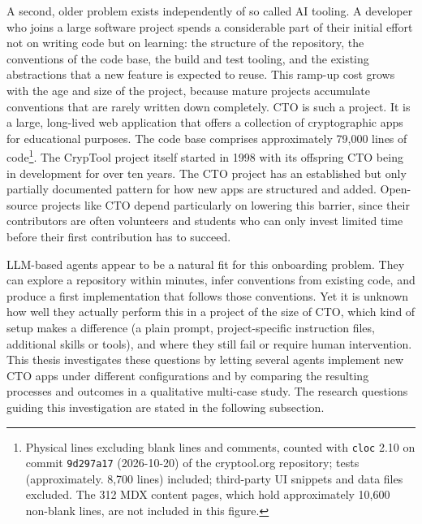 A second, older problem exists independently of so called \ac{AI} tooling.  A developer who joins a large software project spends a considerable part of their initial effort not on writing code but on learning: the structure of the repository, the conventions of the code base, the build and test tooling, and the existing abstractions that a new feature is expected to reuse. This ramp-up cost grows with the age and size of the project, because mature projects accumulate conventions that are rarely written down completely. \ac{CTO} is such a project. It is a large, long-lived web application that offers a collection of cryptographic apps for educational purposes. The code base comprises approximately 79,000 lines of code\footnote{Physical lines excluding blank lines and comments, counted with \texttt{cloc} 2.10 on commit \texttt{9d297a17} (2026-10-20) of the cryptool.org repository; tests (approximately. 8,700 lines) included; third-party UI snippets and data files excluded. The 312 MDX content pages, which hold approximately 10,600 non-blank lines, are not included in this figure.}. The CrypTool project itself started in 1998 with its offspring \ac{CTO} being in development for over ten years. The \ac{CTO} project has an established but only partially documented pattern for how new apps are structured and added. Open-source projects like \ac{CTO} depend particularly on lowering this barrier, since their contributors are often volunteers and students who can only invest limited time before their first contribution has to succeed.



\ac{LLM}-based agents appear to be a natural fit for this onboarding problem. They can explore a repository within minutes, infer conventions from existing code, and produce a first implementation that follows those conventions. Yet it is unknown how well they actually perform this in a project of the size of \ac{CTO}, which kind of setup makes a difference (a plain prompt, project-specific instruction files, additional skills or tools), and where they still fail or require human intervention. This thesis investigates these questions by letting several agents implement new \ac{CTO} apps under different configurations and by comparing the resulting processes and outcomes in a qualitative multi-case study. The research questions guiding this investigation are stated in the following subsection.

